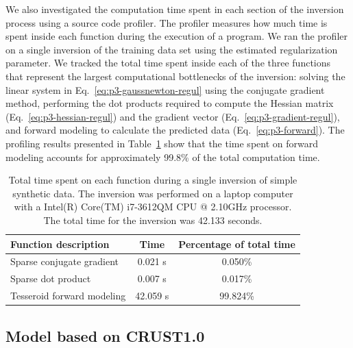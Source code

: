 We also investigated the computation time spent in each section of the inversion
process using a source code profiler.
The profiler measures how much time is spent inside each function during
the execution of a program.
We ran the profiler on a single inversion of the training data set
using the estimated regularization parameter.
We tracked the total time spent inside each of the three functions
that represent the largest computational bottlenecks of the inversion:
solving the linear system in Eq.~\ref{eq:p3-gaussnewton-regul}
using the conjugate gradient method,
performing the dot products required to compute
the Hessian matrix (Eq.~\ref{eq:p3-hessian-regul})
and the gradient vector (Eq.~\ref{eq:p3-gradient-regul}),
and forward modeling to calculate the predicted data (Eq.~\ref{eq:p3-forward}).
The profiling results presented in Table~\ref{profiling}
show that the time spent on forward modeling accounts for approximately
99.8\% of the total computation time.


\begin{table}
    \centering
    \caption{
        Total time spent on each function during a single inversion of
        simple synthetic data.
        The inversion was performed on a laptop computer with a
        Intel(R) Core(TM) i7-3612QM CPU @ 2.10GHz processor.
        The total time for the inversion was 42.133 seconds.
    }
    \label{profiling}
    \begin{tabular}{lcc}
        Function description & Time & Percentage of total time\\
        \hline
        Sparse conjugate gradient & 0.021 s & 0.050\%\\
        Sparse dot product & 0.007 s & 0.017\%\\
        Tesseroid forward modeling & 42.059 s & 99.824\%\\
        \hline
    \end{tabular}
\end{table}



\subsection{Model based on CRUST1.0}\label{sec:p3-crust1}


